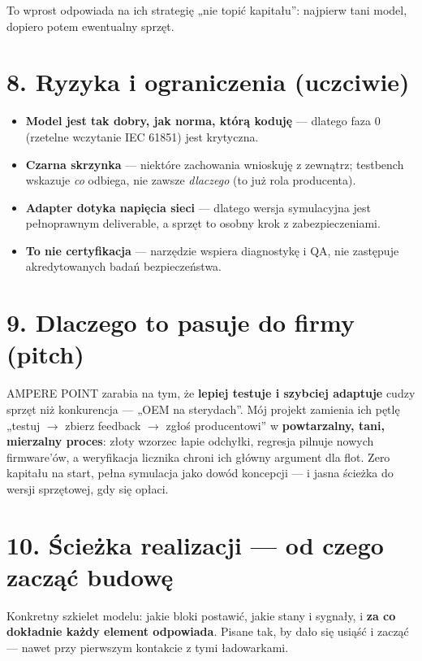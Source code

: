 \documentclass[11pt]{article}
\newcommand{\ra}{$\rightarrow$}
\newcommand{\key}[1]{\textbf{\color{navy}#1}}
\begin{document}
To wprost odpowiada na ich strategię „nie topić kapitału'': najpierw tani model, dopiero potem ewentualny sprzęt.

\section{8. Ryzyka i ograniczenia (uczciwie)}

\begin{itemize}
  \item \key{Model jest tak dobry, jak norma, którą koduję} --- dlatego faza 0 (rzetelne wczytanie IEC 61851) jest krytyczna.
  \item \key{Czarna skrzynka} --- niektóre zachowania wnioskuję z zewnątrz; testbench wskazuje \emph{co} odbiega, nie zawsze \emph{dlaczego} (to już rola producenta).
  \item \key{Adapter dotyka napięcia sieci} --- dlatego wersja symulacyjna jest pełnoprawnym deliverable, a sprzęt to osobny krok z zabezpieczeniami.
  \item \key{To nie certyfikacja} --- narzędzie wspiera diagnostykę i QA, nie zastępuje akredytowanych badań bezpieczeństwa.
\end{itemize}

\section{9. Dlaczego to pasuje do firmy (pitch)}

AMPERE POINT zarabia na tym, że \key{lepiej testuje i szybciej adaptuje} cudzy sprzęt niż konkurencja --- „OEM na sterydach''. Mój projekt zamienia ich pętlę „testuj \ra{} zbierz feedback \ra{} zgłoś producentowi'' w \key{powtarzalny, tani, mierzalny proces}: złoty wzorzec łapie odchyłki, regresja pilnuje nowych firmware'ów, a weryfikacja licznika chroni ich główny argument dla flot. Zero kapitału na start, pełna symulacja jako dowód koncepcji --- i jasna ścieżka do wersji sprzętowej, gdy się opłaci.


\section{10. Ścieżka realizacji --- od czego zacząć budowę}

Konkretny szkielet modelu: jakie bloki postawić, jakie stany i sygnały, i \key{za co dokładnie każdy element odpowiada}. Pisane tak, by dało się usiąść i zacząć --- nawet przy pierwszym kontakcie z tymi ładowarkami.
\end{document}
